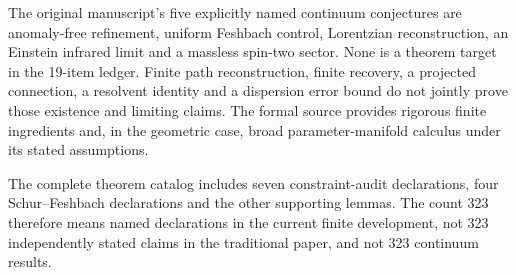 The original manuscript's five explicitly named continuum conjectures are anomaly-free refinement, uniform Feshbach control, Lorentzian reconstruction, an Einstein infrared limit and a massless spin-two sector. None is a theorem target in the 19-item ledger. Finite path reconstruction, finite recovery, a projected connection, a resolvent identity and a dispersion error bound do not jointly prove those existence and limiting claims. The formal source provides rigorous finite ingredients and, in the geometric case, broad parameter-manifold calculus under its stated assumptions.

The complete theorem catalog includes seven constraint-audit declarations, four Schur--Feshbach declarations and the other supporting lemmas. The count 323 therefore means named declarations in the current finite development, not 323 independently stated claims in the traditional paper, and not 323 continuum results.
